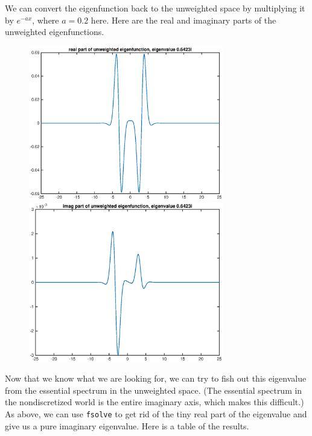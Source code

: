 \documentclass[12pt]{article}
\begin{document}
We can convert the eigenfunction back to the unweighted space by multiplying it by $e^{-ax}$, where $a = 0.2$ here. Here are the real and imaginary parts of the unweighted eigenfunctions.
\begin{figure}[H]
\includegraphics[width=8.5cm]{1double2eigenfnrealunweighted}
\includegraphics[width=8.5cm]{1double2eigenfnimagunweighted}
\end{figure}

Now that we know what we are looking for, we can try to fish out this eigenvalue from the essential spectrum in the unweighted space. (The essential spectrum in the nondiscretized world is the entire imaginary axis, which makes this difficult.) As above, we can use \texttt{fsolve} to get rid of the tiny real part of the eigenvalue and give us a pure imaginary eigenvalue. Here is a table of the results.
\end{document}
